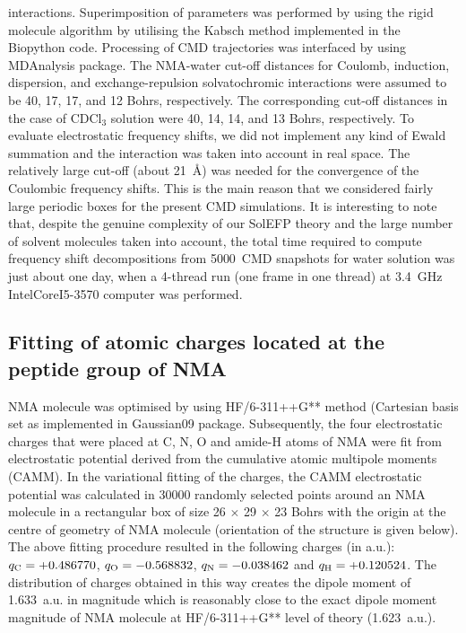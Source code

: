 \documentclass[a4paper,titlepage,twoside,fleqn,12pt]{book}
\begin{document}
\begin{appendices}
\begin{refsection}
interactions. Superimposition of parameters was performed by
using the rigid molecule algorithm \citep{Blasiak.Lee.Cho.JCP.2013} 
by utilising the Kabsch
method \citep{Kabsch.ActCrystSecA.1976} 
implemented in the {\sc Biopython} code. \citep{Biopython.Bioinformatics.2009}
Processing
of CMD trajectories was interfaced by using {\sc MDAnalysis}
package. \citep{MDAnalysis.JCC.2011} 
The NMA\hyp{}water cut\hyp{}off distances for Coulomb,
induction, dispersion, and exchange\hyp{}repulsion solvatochromic
interactions were assumed to be 40, 17, 17, and 12 Bohrs,
respectively. The corresponding cut\hyp{}off distances in the case of
CDCl$_3$ solution were 40, 14, 14, and 13 Bohrs, respectively. To
evaluate electrostatic frequency shifts, we did not implement
any kind of Ewald summation and the interaction was taken
into account in real space. The relatively large cut\hyp{}off (about
21~\AA) was needed for the convergence of the Coulombic
frequency shifts. This is the main reason that we considered
fairly large periodic boxes for the present CMD simulations. It is
interesting to note that, despite the genuine complexity of our
SolEFP theory and the large number of solvent molecules
taken into account, the total time required to compute
frequency shift decompositions from 5000~CMD snapshots for
water solution was just about one day, when a 4\hyp{}thread run (one
frame in one thread) at 3.4~GHz Intel\textregistered Core\texttrademark I5\hyp{}3570 computer
was performed.

\subsection{Fitting of atomic charges located at the peptide group of NMA\label{a:nma-esp-fit}}

NMA molecule was optimised by using HF/6-311++G** method (Cartesian basis set
as implemented in {\sc Gaussian09} package. Subsequently, the four
electrostatic charges that were placed at C, N, O and amide-H atoms of NMA were fit from
electrostatic potential derived from the cumulative atomic multipole moments (CAMM). In
the variational fitting of the charges, the CAMM electrostatic potential was calculated in
30000 randomly selected points around an NMA molecule in a rectangular box of size 
26 $\times$ 29 $\times$ 23 Bohrs with the origin at the centre of geometry of NMA molecule (orientation of the
structure is given below). The above fitting procedure resulted in the following charges (in
a.u.): $q_{\rm C}=+0.486770$, $q_{\rm O}=-0.568832$, $q_{\rm N}=-0.038462$ and 
$q_{\rm H}=+0.120524$. The distribution of
charges obtained in this way creates the dipole moment of 1.633~a.u. in magnitude which is
reasonably close to the exact dipole moment magnitude of NMA molecule at 
HF/6-311++G** level of theory (1.623~a.u.).


\end{refsection}
\end{appendices}
\end{document}
